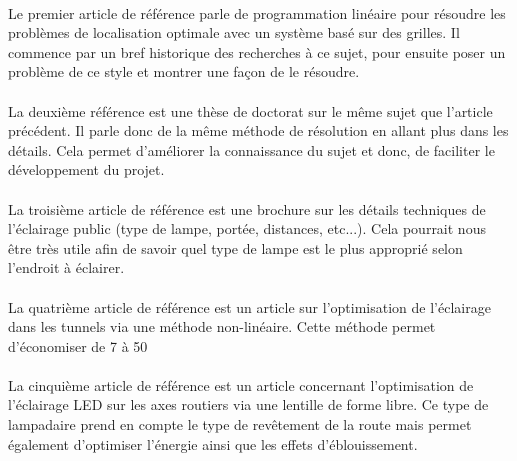 
\paragraph{}
Le premier article de r\'ef\'erence \cite{mainref} parle de programmation lin\'eaire pour r\'esoudre les problèmes de localisation optimale avec un syst\`eme bas\'e sur des grilles. Il commence par un bref historique des recherches \`a ce sujet, pour ensuite poser  un probl\`eme de ce style et montrer une fa\c{c}on de le r\'esoudre.



\paragraph{}
La deuxi\`eme r\'ef\'erence \cite{phdref} est une th\`ese de doctorat sur le m\^eme sujet que l'article pr\'ec\'edent. Il parle donc de la m\^eme m\'ethode de r\'esolution en allant plus dans les d\'etails. Cela permet d'am\'eliorer la connaissance du sujet et donc, de faciliter le d\'eveloppement du projet.

\paragraph{}
La troisi\`eme article de référence \cite{ascenref} est une brochure sur les détails techniques de l'éclairage public (type de lampe, portée, distances, etc...). Cela pourrait nous \^etre très utile afin de savoir quel type de lampe est le plus approprié selon l'endroit à éclairer.

\paragraph{}
La quatri\`eme article de référence \cite{tunnelref} est un article sur l'optimisation de l'éclairage dans les tunnels via une méthode non-linéaire. Cette méthode permet d'économiser de 7 à 50%

\paragraph{}
La cinqui\`eme article de référence \cite{ledref} est un article concernant l'optimisation de l'éclairage LED sur les axes routiers via une lentille de forme libre. Ce type de lampadaire prend en compte le type de revêtement de la route mais permet également d'optimiser l'énergie ainsi que les effets d'éblouissement.

